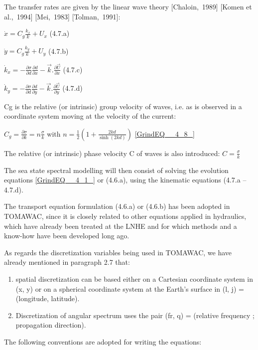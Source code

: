  The transfer rates are given by the linear wave theory [Chaloin,~1989] [Komen et al.,~1994] [Mei,~1983] [Tolman,~1991]:

$\dot{x}=C_{g} \frac{k_{x} }{k} +U_{x} $ (4.7.a)

$\dot{y}=C_{g} \frac{k_{y} }{k} +U_{y} $ (4.7.b)

$\dot{k}_{x} =-\frac{\partial \sigma }{\partial d} \frac{\partial d}{\partial x} -\vec{k}.\frac{\partial \vec{U}}{\partial x} $ (4.7.c)

$\dot{k}_{y} =-\frac{\partial \sigma }{\partial d} \frac{\partial d}{\partial y} -\vec{k}.\frac{\partial \vec{U}}{\partial y} $ (4.7.d)

 Cg is the relative (or intrinsic) group velocity of waves, i.e. as is observed in a coordinate system moving at the velocity of the current:

$C_{g} =\frac{\partial \sigma }{\partial k} =n\frac{\sigma }{k} $  with  $n=\frac{1}{2} \left(1+\frac{2kd}{\sinh (2kd)} \right)$ \eqref{GrindEQ__4_8_}

 The relative (or intrinsic) phase velocity C of waves is also introduced:  $C=\frac{\sigma }{k} $

 The sea state spectral modelling will then consist of solving the evolution equations \eqref{GrindEQ__4_1_} or (4.6.a), using the kinematic equations (4.7.a -- 4.7.d).

 The transport equation formulation (4.6.a) or (4.6.b) has been adopted in TOMAWAC, since it is closely related to other equations applied in hydraulics, which have already been treated at the LNHE and for which methods and a know-how have been developed long ago.

 As regards the discretization variables being used in TOMAWAC, we have already mentioned in paragraph 2.7 that:

 \begin{enumerate}
\item spatial discretization can be based either on a Cartesian coordinate system in (x, y) or on a spherical coordinate system at the Earth's surface in (l, j) = (longitude, latitude).

 \item Discretization of angular spectrum uses the pair (fr, q) = (relative frequency ; propagation direction).
\end{enumerate}

 The following conventions are adopted for writing the equations:

